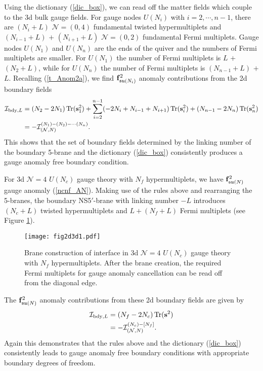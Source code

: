 \documentclass{article}
\DeclareMathOperator*{\Tr}{{\rm Tr}}
\numberwithin{equation}{section}
\begin{document}
Using the dictionary (\ref{dic_box}), 
we can read off the matter fields which couple to the 3d bulk gauge fields. 
For gauge nodes $U(N_{i})$ with $i=2,\cdots, n-1$, 
there are $(N_{i}+L)$ $\mathcal{N}=(0,4)$ fundamental twisted hypermultiplets 
and $(N_{i-1}+L)$ $+$ $(N_{i+1}+L)$ $\mathcal{N}=(0,2)$ fundamental Fermi multiplets. 
Gauge nodes $U(N_{1})$ and $U(N_{n})$ are the ends of the quiver and the numbers of Fermi multiplets are smaller.
For $U(N_{1})$ the number of Fermi multiplets is $L$ $+$ $(N_{2}+L)$, 
while for $U(N_{n})$ the number of Fermi multiplets is $(N_{n-1}+L)$ $+$ $L$. 
Recalling (\ref{t_Anom2a}), 
we find ${\bf f}_{\mathfrak{su}(N_{i})}^{2}$ anomaly contributions from the 2d boundary fields
\begin{align}
\label{quiver_bdy_AN}
\mathcal{I}_{\textrm{bdy}, L}
&=(N_{2}-2N_{1})
\Tr ({\bf s}_{1}^{2})
+\sum_{i=2}^{n-1}(-2N_{i}+N_{i-1}+N_{i+1})\Tr ({\bf s}_{i}^{2})
+(N_{n-1}-2N_{n})\Tr ({\bf s}_{n}^{2})
\nonumber\\
&=-\mathcal{I}^{(N_{1})-(N_{2})- \cdots (N_{n})}_{(\mathcal{N}, N)}. 
\end{align}
This shows that 
the set of boundary fields determined by the linking number of the boundary 5-brane and the dictionary (\ref{dic_box}) 
consistently produces a gauge anomaly free boundary condition. 



For 3d $\mathcal{N}=4$ $U(N_{c})$ gauge theory with $N_{f}$ hypermultiplets, 
we have ${\bf f}_{\mathfrak{su}(N)}^{2}$ gauge anomaly (\ref{ncnf_AN}). 
Making use of the rules above and rearranging the 5-branes, 
the boundary NS5$'$-brane with linking number $-L$ 
introduces $(N_{c}+L)$ twisted hypermultiplets and $L+(N_{f}+L)$ Fermi multiplets 
(see Figure \ref{fig2d3d1}). 
\begin{figure}
\begin{center}
\texttt{[image: fig2d3d1.pdf]}
\caption{Brane construction of interface in  
3d $\mathcal{N}=4$ $U(N_{c})$ gauge theory with $N_{f}$ hypermultiplets. 
After the brane creation, the required Fermi multiplets for gauge anomaly cancellation can be read off from the diagonal edge. }
\label{fig2d3d1}
\end{center}
\end{figure}
The ${\bf f}_{\mathfrak{su}(N)}^{2}$ anomaly contributions from these 2d boundary fields are given by 
\begin{align}
\label{ncnf_bdy_AN}
\mathcal{I}_{\textrm{bdy},L}
&=
(N_{f}-2N_{c})\Tr ({\bf s}^{2})
\nonumber\\
&=-\mathcal{I}_{(\mathcal{N},N)}^{(N_{c})-[N_{f}]}. 
\end{align}
Again this demonstrates that 
the rules above and the dictionary (\ref{dic_box}) consistently leads to 
gauge anomaly free boundary conditions with appropriate boundary degrees of freedom. 
\end{document}
